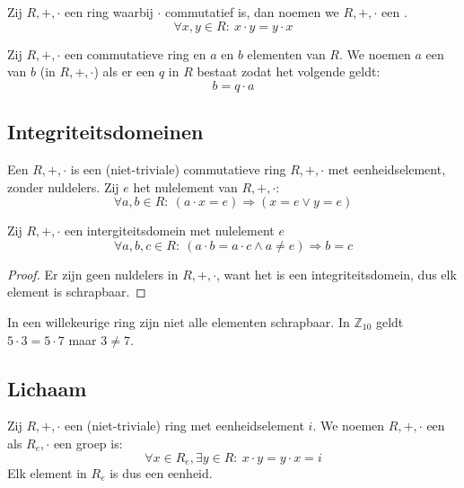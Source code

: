 \documentclass[main.tex]{subfiles}
\begin{document}
\begin{de}
  Zij $R,+,\cdot$ een ring waarbij $\cdot$ commutatief is, dan noemen we $R,+,\cdot$ een .
  \[ \forall x,y \in R:\ x\cdot y = y \cdot x \]
\end{de}

\begin{de}
  Zij $R,+,\cdot$ een commutatieve ring en $a$ en $b$ elementen van $R$.
  We noemen $a$ een  van $b$ (in $R,+,\cdot$) als er een $q$ in $R$ bestaat zodat het volgende geldt:
  \[ b = q \cdot a \]
\end{de}

\subsection{Integriteitsdomeinen}
\label{sec:integriteitsdomeinen}

\begin{de}
  \label{de:integriteitsdomein}
  Een  $R,+,\cdot$ is een (niet-triviale) commutatieve ring $R,+,\cdot$ met eenheidselement, zonder nuldelers.
  Zij $e$ het nulelement van $R,+,\cdot$:
  \[ \forall a, b \in R:\ (a \cdot x = e) \Rightarrow (x = e \vee y = e) \]
\end{de}

\begin{ei}
  Zij $R,+,\cdot$ een intergiteitsdomein met nulelement $e$
  \[ \forall a,b,c \in R:\ (a\cdot b = a\cdot c \wedge a \neq e) \Rightarrow b = c \]

  \begin{proof}
    Er zijn geen nuldelers in $R,+,\cdot$, want het is een integriteitsdomein, dus elk element is schrapbaar.
  \end{proof}
\end{ei}

\begin{opm}
  In een willekeurige ring zijn niet alle elementen schrapbaar.
  In $\mathbb{Z}_{10}$ geldt $5\cdot 3 = 5 \cdot 7$ maar $3 \neq 7$.
\end{opm}

\subsection{Lichaam}
\label{sec:lichaam}

\begin{de}
  Zij $R,+,\cdot$ een (niet-triviale) ring met eenheidselement $i$.
  We noemen $R,+,\cdot$ een  als $R_{e},\cdot$ een groep is:
  \[ \forall x \in R_{e}, \exists y \in R:\ x\cdot y = y \cdot x = i \]
  Elk element in $R_{e}$ is dus een eenheid.
\end{de}
\end{document}
